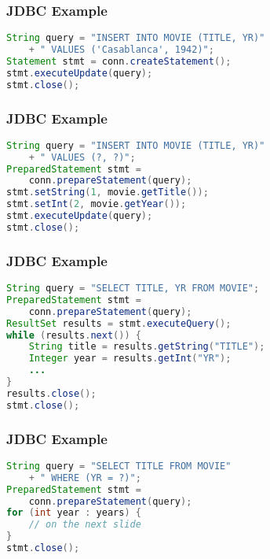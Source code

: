 \documentclass[dvipsnames]{beamer}
\theoremstyle{plain}
\begin{document}
\begin{frame}[fragile]
  \frametitle{JDBC Example}

  \begin{example}
    \begin{lstlisting}[language=Java]
String query = "INSERT INTO MOVIE (TITLE, YR)"
    + " VALUES ('Casablanca', 1942)";
Statement stmt = conn.createStatement();
stmt.executeUpdate(query);
stmt.close();
    \end{lstlisting}
  \end{example}
\end{frame}

\begin{frame}[fragile]
  \frametitle{JDBC Example}

  \begin{example}
    \begin{lstlisting}[language=Java]
String query = "INSERT INTO MOVIE (TITLE, YR)"
    + " VALUES (?, ?)";
PreparedStatement stmt =
    conn.prepareStatement(query);
stmt.setString(1, movie.getTitle());
stmt.setInt(2, movie.getYear());
stmt.executeUpdate(query);
stmt.close();
    \end{lstlisting}
  \end{example}
\end{frame}

\begin{frame}[fragile]
  \frametitle{JDBC Example}

  \begin{example}[listing]
    \begin{lstlisting}[language=Java]
String query = "SELECT TITLE, YR FROM MOVIE";
PreparedStatement stmt =
    conn.prepareStatement(query);
ResultSet results = stmt.executeQuery();
while (results.next()) {
    String title = results.getString("TITLE");
    Integer year = results.getInt("YR");
    ...
}
results.close();
stmt.close();
    \end{lstlisting}
  \end{example}
\end{frame}

\begin{frame}[fragile]
  \frametitle{JDBC Example}

  \begin{example}
    \begin{lstlisting}[language=Java]
String query = "SELECT TITLE FROM MOVIE"
    + " WHERE (YR = ?)";
PreparedStatement stmt =
    conn.prepareStatement(query);
for (int year : years) {
    // on the next slide
}
stmt.close();
    \end{lstlisting}
  \end{example}
\end{frame}
\end{document}
